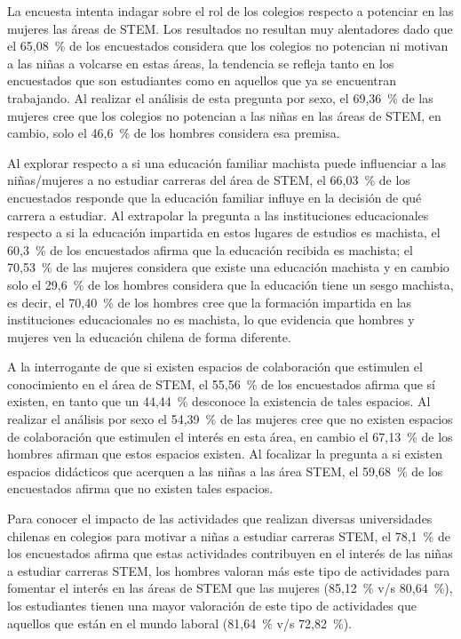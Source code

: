 \documentclass[spanish]{textolivre}
\begin{document}
La encuesta intenta indagar sobre el rol de los colegios respecto a potenciar en las mujeres las áreas de STEM. Los resultados no resultan muy alentadores dado que el 65,08~\% de los encuestados considera que los colegios no potencian ni motivan a las niñas a volcarse en estas áreas, la tendencia se refleja tanto en los encuestados que son estudiantes como en aquellos que ya se encuentran trabajando. Al realizar el análisis de esta pregunta por sexo, el 69,36~\% de las mujeres cree que los colegios no potencian a las niñas en las áreas de STEM, en cambio, solo el 46,6~\% de los hombres considera esa premisa.

Al explorar respecto a si una educación familiar machista puede influenciar a las niñas/mujeres a no estudiar carreras del área de STEM, el 66,03~\% de los encuestados responde que la educación familiar influye en la decisión de qué carrera a estudiar. Al extrapolar la pregunta a las instituciones educacionales respecto a si la educación impartida en estos lugares de estudios es machista, el 60,3~\% de los encuestados afirma que la educación recibida es machista; el 70,53~\% de las mujeres considera que existe una educación machista y en cambio solo el 29,6~\% de los hombres considera que la educación tiene un sesgo machista, es decir, el 70,40~\% de los hombres cree que la formación impartida en las instituciones educacionales no es machista, lo que evidencia que hombres y mujeres ven la educación chilena de forma diferente.

A la interrogante de que si existen espacios de colaboración que estimulen el conocimiento en el área de STEM, el 55,56~\% de los encuestados afirma que sí existen, en tanto que un 44,44~\% desconoce
la existencia de tales espacios. Al realizar el análisis por sexo el 54,39~\% de las mujeres cree que no existen espacios de colaboración que estimulen el interés en esta área, en cambio el 67,13~\% de los hombres afirman que estos espacios existen. Al focalizar la pregunta a si existen espacios didácticos que acerquen a las niñas a las área STEM, el 59,68~\% de los encuestados afirma que no existen tales espacios.

Para conocer el impacto de las actividades que realizan diversas universidades chilenas en colegios para motivar a niñas a estudiar carreras STEM, el 78,1~\% de los encuestados afirma que estas actividades contribuyen en el interés de las niñas a estudiar carreras STEM, los hombres valoran más este tipo de actividades para fomentar el interés en las áreas de STEM que las mujeres (85,12~\% v/s 80,64~\%), los estudiantes tienen una mayor valoración de este tipo de actividades que aquellos que están en el mundo laboral (81,64~\% v/s 72,82~\%).
\end{document}
